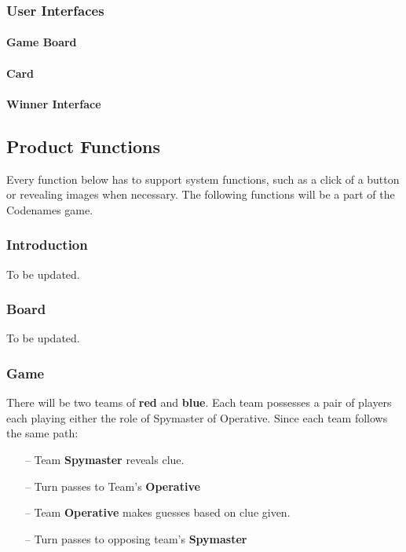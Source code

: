 \documentclass[10pt, a4paper]{article}
\begin{document}
		\subsubsection{User Interfaces}
	
			\paragraph{Game Board}
			
			\paragraph{Card}
			
			\paragraph{Winner Interface}
			
	\subsection{Product Functions}
	
	Every function below has to support system  functions, such as a click of a button or revealing images when necessary. The following functions will be a part of the Codenames game.\\
	
		\subsubsection{Introduction}
		
		To be updated.\\
		
		\subsubsection{Board}
		
		To be updated.\\
		
		\subsubsection{Game}
		
		There will be two teams of \textbf{red} and \textbf{blue}. Each team possesses a pair of players each playing either the role of Spymaster of Operative. Since each team follows the same path:\\
		
		\begin{itemize}
			\item [--] Team \textbf{Spymaster} reveals clue.
			\item [--] Turn passes to Team's \textbf{Operative}
			\item [--] Team \textbf{Operative} makes guesses based on clue given.
			\item [--] Turn passes to opposing team's \textbf{Spymaster}
		\end{itemize}
	
\end{document}
